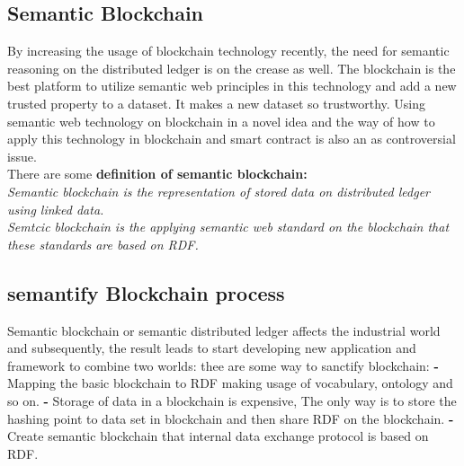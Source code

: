 \subsection{Semantic Blockchain}
By increasing the usage of blockchain technology recently, the need for semantic reasoning on the distributed ledger is on the crease as well. The blockchain is the best platform to utilize semantic web principles in this technology and add a new trusted property to a dataset. It makes a new dataset so trustworthy. 
Using semantic web technology on blockchain in a novel idea and the way of how to apply this technology in blockchain and smart contract is also an as controversial issue.\\
There are some \textbf{definition of semantic blockchain:}\\ 
\textit{Semantic blockchain is the representation of stored data on distributed ledger using linked data. }\\
\textit{Semtcic blockchain is the applying semantic web standard on the blockchain that these standards are based on RDF.}

\subsection{semantify Blockchain process}
Semantic blockchain or semantic distributed ledger affects the industrial world and subsequently, the result leads to start developing new application and framework to combine two worlds:
thee are some way to sanctify blockchain:
\textbf{-}Mapping the basic blockchain to RDF making usage of vocabulary, ontology and so on.
\textbf{-} Storage of data in a blockchain is expensive, The only way is to store the hashing point to data set in blockchain and then share RDF on the blockchain.
\textbf{-} Create semantic blockchain that internal data exchange protocol is based on RDF\cite{Hector}.

